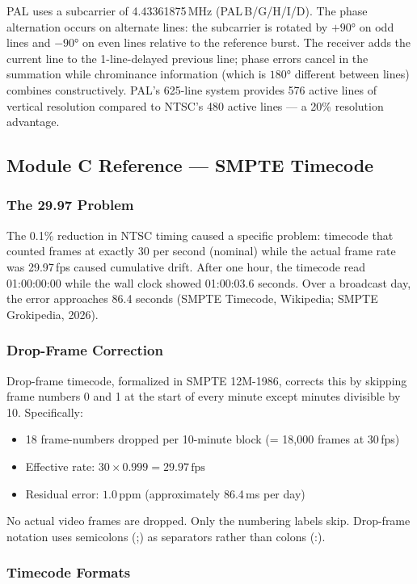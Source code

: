 \documentclass[11pt,letterpaper]{article}
\begin{document}
PAL uses a subcarrier of 4.43361875\,MHz (PAL\,B/G/H/I/D). The phase alternation occurs on alternate
lines: the subcarrier is rotated by $+90°$ on odd lines and $-90°$ on even lines relative to the
reference burst. The receiver adds the current line to the 1-line-delayed previous line; phase errors
cancel in the summation while chrominance information (which is $180°$ different between lines) combines
constructively. PAL's 625-line system provides 576 active lines of vertical resolution compared to
NTSC's 480 active lines --- a 20\% resolution advantage.

\subsection{Module C Reference --- SMPTE Timecode}

\subsubsection{The 29.97 Problem}

The 0.1\% reduction in NTSC timing caused a specific problem: timecode that counted frames at
exactly 30 per second (nominal) while the actual frame rate was 29.97\,fps caused cumulative drift.
After one hour, the timecode read 01:00:00:00 while the wall clock showed 01:00:03.6 seconds. Over
a broadcast day, the error approaches 86.4 seconds (SMPTE Timecode, Wikipedia; SMPTE Grokipedia, 2026).

\subsubsection{Drop-Frame Correction}

Drop-frame timecode, formalized in SMPTE 12M-1986, corrects this by skipping frame numbers 0 and 1
at the start of every minute except minutes divisible by 10. Specifically:
\begin{itemize}[leftmargin=*]
  \item 18 frame-numbers dropped per 10-minute block (= 18,000 frames at 30\,fps)
  \item Effective rate: $30 \times 0.999 = 29.97\,\text{fps}$
  \item Residual error: $1.0\,\text{ppm}$ (approximately 86.4\,ms per day)
\end{itemize}
No actual video frames are dropped. Only the numbering labels skip. Drop-frame notation uses
semicolons (;) as separators rather than colons (:).

\subsubsection{Timecode Formats}
\end{document}
